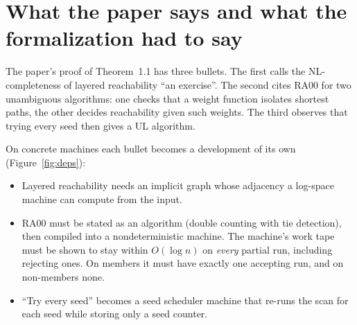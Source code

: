 \documentclass[11pt]{article}
\begin{document}
\section{What the paper says and what the formalization had to say}
\label{sec:gap}

The paper's proof of Theorem~1.1 has three bullets. The first calls the NL-completeness of layered
reachability ``an exercise''. The second cites RA00 for two unambiguous algorithms: one checks
that a weight function isolates shortest paths, the other decides reachability given such
weights. The third observes that trying every seed then gives a UL algorithm.

On concrete machines each bullet becomes a development of its own (Figure~\ref{fig:deps}):
\begin{itemize}
\item Layered reachability needs an implicit graph whose adjacency a log-space machine can
compute from the input.
\item RA00 must be stated as an algorithm (double counting with tie detection), then compiled into
a nondeterministic machine. The machine's work tape must be shown to stay within $O(\log n)$ on
\emph{every} partial run, including rejecting ones. On members it must have exactly one accepting
run, and on non-members none.
\item ``Try every seed'' becomes a seed scheduler machine that re-runs the scan for each seed while
storing only a seed counter.
\end{itemize}
\end{document}
